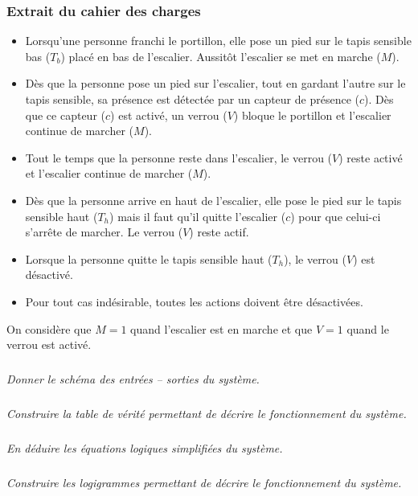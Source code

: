\documentclass[10pt]{article}
\begin{document}
\subsubsection*{Extrait du cahier des charges}
\setcounter{subparagraph}{0}
\begin{itemize}
\item Lorsqu'une personne franchi le portillon, elle pose un pied sur le tapis sensible bas ($T_b$) placé en bas de l'escalier. Aussitôt l'escalier se met en marche ($M$).
\item Dès que la personne pose un pied sur l'escalier, tout en gardant l'autre sur le tapis sensible, sa présence est détectée par un capteur de présence ($c$). Dès que ce capteur ($c$) est activé, un verrou ($V$) bloque le portillon et l'escalier continue de marcher ($M$).
\item Tout le temps que la personne reste dans l'escalier, le verrou ($V$) reste activé et l'escalier continue de marcher ($M$).
\item Dès que la personne arrive en haut de l'escalier, elle pose le pied sur le tapis sensible haut ($T_h$) mais il faut qu'il quitte l'escalier ($c$) pour que celui-ci s'arrête de marcher. Le verrou ($V$) reste actif. 
\item Lorsque la personne quitte le tapis sensible haut ($T_h$), le verrou ($V$) est désactivé. 
\item Pour tout cas indésirable, toutes les actions doivent être désactivées.
\end{itemize}

On considère que $M=1$ quand l'escalier est en marche et que $V=1$ quand le verrou est activé. 

\subparagraph{}
\textit{Donner le schéma des entrées -- sorties du système.}

\subparagraph{}
\textit{Construire la table de vérité permettant de décrire le fonctionnement du système.}

\subparagraph{}
\textit{En déduire les équations logiques simplifiées du système.}

\subparagraph{}
\textit{Construire les logigrammes permettant de décrire le fonctionnement du système.}
\end{document}

